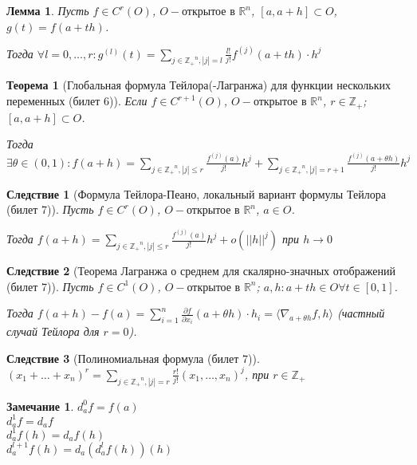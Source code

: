 \documentclass[11pt,a4paper,oneside]{scrartcl}
\newtheorem{lemma}{Лемма}
\newtheorem{theorem}{Теорема}
\newtheorem{consequence}{Следствие}
\newtheorem*{remark}{Замечание}
\begin{document}
\begin{lemma}
    Пусть $f \in C^r (O)$, $O - \text{открытое в } \mathbb{R}^n$, $[a, a+h] \subset O$,
    $g(t) = f(a + th)$.

    Тогда $\forall l = 0, \dots, r :
        g^{(l)} (t) = \sum_{j \in \mathbb{Z_+}^n, |j| = l} \frac{l!}{j!} f^{(j)} (a + th) \cdot h^j$
\end{lemma}

\begin{theorem}[Глобальная формула Тейлора(-Лагранжа) для функции нескольких переменных (билет 6)]
    Если $f \in C^{r+1} (O)$, $O - \text{открытое в } \mathbb{R}^n$, $r \in \mathbb{Z_+}$;
    $[a, a+h] \subset O$.

    Тогда $\exists \theta \in (0, 1):
        f(a+h) = \sum_{j \in \mathbb{Z_+}^n, |j| \leq r} \frac{f^{(j)} (a)}{j!} h^j
        + \sum_{j \in \mathbb{Z_+}^n, |j| = r+1} \frac{f^{(j)} (a + \theta h)}{j!} h^j$
\end{theorem}

\begin{consequence}[Формула Тейлора-Пеано, локальный вариант формулы Тейлора (билет 7)]
    Пусть $f \in C^r (O)$, $O - \text{открытое в } \mathbb{R}^n$, $a \in O$.

    Тогда $f(a+h) = \sum_{j \in \mathbb{Z_+}^n, |j| \leq r} \frac{f^{(j)} (a)}{j!} h^j
    + o(||h||^j)$ при $h \rightarrow 0$
\end{consequence}

\begin{consequence}[Теорема Лагранжа о среднем для скалярно-значных отображений (билет 7)]
    Пусть $f \in C^1 (O)$, $O - \text{открытое в } \mathbb{R}^n$;
    $a, h: a+th \in O \forall t \in [0, 1]$.

    Тогда $f(a+h) - f(a) = \sum_{i=1}^n \frac{\partial f}{\partial x_i} (a + \theta h) \cdot h_i
        = \langle \nabla_{a + \theta h} f, h \rangle$ (частный случай Тейлора для $r = 0$).
\end{consequence}

\begin{consequence}[Полиномиальная формула (билет 7)]
    $(x_1 + \dots + x_n)^r = \sum_{j \in \mathbb{Z_+}^n, |j| = r} \frac{r!}{j!} (x_1, \dots, x_n)^j$,
    при $r \in \mathbb{Z_+}$
\end{consequence}

\begin{remark}
    $d_a^0 f = f(a)$ \\
    $d_a^1 f = d_a f$ \\
    $d_a^1 f(h) = d_a f(h)$ \\
    $d_a^{l+1} f(h) = d_a (d_a^l f(h)) (h)$
\end{remark}
\end{document}
